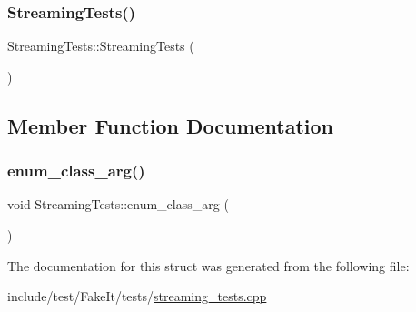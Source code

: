 \subsubsection{\texorpdfstring{StreamingTests()}{StreamingTests()}}
{\footnotesize\ttfamily Streaming\+Tests\+::\+Streaming\+Tests (\begin{DoxyParamCaption}{ }\end{DoxyParamCaption})\hspace{0.3cm}{\ttfamily [inline]}}



\subsection{Member Function Documentation}
\mbox{\label{structStreamingTests_a883c42aa2543efda0f52fa48a85d4b17}} 
\subsubsection{\texorpdfstring{enum\_class\_arg()}{enum\_class\_arg()}}
{\footnotesize\ttfamily void Streaming\+Tests\+::enum\+\_\+class\+\_\+arg (\begin{DoxyParamCaption}{ }\end{DoxyParamCaption})\hspace{0.3cm}{\ttfamily [inline]}}



The documentation for this struct was generated from the following file\+:\begin{DoxyCompactItemize}
\item 
include/test/\+Fake\+It/tests/\mbox{\hyperlink{streaming__tests_8cpp}{streaming\+\_\+tests.\+cpp}}\end{DoxyCompactItemize}
